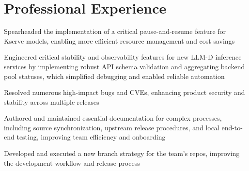 \documentclass[]{deedy-resume-reversed}
\begin{document}
%
%

%
%

%
%

\begin{minipage}[t]{0.68\textwidth}

\section{Professional Experience}

\vspace{\topsep} %
\begin{tightemize}
\item Spearheaded the implementation of a critical pause-and-resume feature for Kserve models, enabling more efficient resource management and cost savings
\item Engineered critical stability and observability features for new LLM-D inference services by implementing robust API schema validation and aggregating backend pool statuses, which simplified debugging and enabled reliable automation
\item Resolved numerous high-impact bugs and CVEs, enhancing product security and stability across multiple releases
\item Authored and maintained essential documentation for complex processes, including source synchronization, upstream release procedures, and local end-to-end testing, improving team efficiency and onboarding
\item Developed and executed a new branch strategy for the team's repos, improving the development workflow and release process
\end{tightemize}
\sectionsep


\end{minipage}
\end{document}
